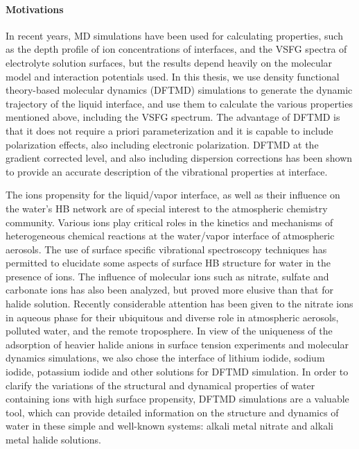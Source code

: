 \paragraph{Motivations}
In recent years, MD simulations have been used for calculating properties, 
such as the depth profile of ion concentrations of interfaces\cite{Jungwirth2001,Jungwirth2002}, and the VSFG spectra 
of electrolyte solution surfaces\cite{Gopalakrishnan2006,Johnson2014,Ishiyama2014,Ishiyama2017},
but the results depend heavily on the molecular model and interaction potentials used\cite{LXD03,MKP04,TI07,MM05}.
In this thesis, we use density functional theory-based molecular dynamics (DFTMD) simulations to generate the dynamic trajectory of 
the liquid interface, and use them to calculate the various properties mentioned above, including the VSFG spectrum.  
The advantage of DFTMD is that it does not require a priori parameterization and it is capable to include polarization effects\cite{Ufimtsev2011},
also including electronic polarization. DFTMD at the gradient corrected level, and also including dispersion corrections\cite{Grimme04,Grimme06,Grimme07,Grimme10,Baer2011}
has been shown to provide an accurate description of the vibrational properties at interface\cite{Fornaro2015}.

%
The ions propensity for the liquid/vapor interface, as well as their influence on  
the water's HB network are of special interest to the atmospheric chemistry 
community.\cite{FPBJ,BJ} Various ions play critical roles in the kinetics 
and mechanisms of heterogeneous chemical reactions at the water/vapor interface of atmospheric aerosols. 
The use of surface specific vibrational spectroscopy techniques has 
permitted to elucidate some aspects of surface HB structure for water in 
the presence of ions.\cite{AJ12,AGL05} The influence of molecular ions such as nitrate­, sulfate­ and 
carbonate ions­ has also been analyzed, but proved more elusive than that for halide solution\cite{SG05,PS03}.
Recently considerable attention has been given to the nitrate ions in aqueous phase 
for their ubiquitous and diverse role in atmospheric aerosols, polluted water, 
and the remote troposphere\cite{BJ,XuM2009,Jubb2012}.
In view of the uniqueness of the adsorption of heavier halide anions in surface tension experiments and molecular dynamics simulations, 
we also chose the interface of lithium iodide, sodium iodide, potassium iodide and other solutions for DFTMD simulation.
In order to clarify the variations of the structural and dynamical properties 
of water containing ions with high surface propensity, DFTMD simulations are a valuable tool, 
which can provide detailed information on the structure and dynamics  
of water in these simple and well-known systems: alkali metal nitrate and alkali metal halide solutions\cite{KM98}.


